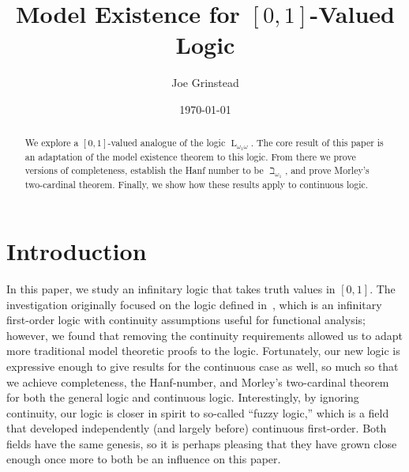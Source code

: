 \documentclass{amsart}
\theoremstyle{definition}
\numberwithin{equation}{theorem}
\newcommand{\baselang}{\operatorname{L}}
\newcommand{\lang}{\baselang_{\omega_1\omega}}
\begin{document}
\title{Model Existence for $[0,1]$-Valued Logic}

\author{Joe Grinstead}

\address{Department of Mathematics, CMU}




\date{\today}



\begin{abstract}
	We explore a $[0,1]$-valued analogue of the logic $\lang$.
	The core result of this paper is an adaptation of the model existence theorem to this logic.
	From there we prove versions of completeness, establish the Hanf number to be $\beth_{\omega_1}$, and prove Morley's two-cardinal theorem.
	Finally, we show how these results apply to continuous logic.
\end{abstract}

\maketitle
\tableofcontents
\newpage

\section*{Introduction}
In this paper, we study an infinitary logic that takes truth values in $[0,1]$.
The investigation originally focused on the logic defined in~\cite{eagle2014omitting}, which is an infinitary first-order logic with continuity assumptions useful for functional analysis; however, we found that removing the continuity requirements allowed us to adapt more traditional model theoretic proofs to the logic.
Fortunately, our new logic is expressive enough to give results for the continuous case as well, so much so that we achieve completeness, the Hanf-number, and Morley's two-cardinal theorem for both the general logic and continuous logic.
Interestingly, by ignoring continuity, our logic is closer in spirit to so-called ``fuzzy logic,'' which is a field that developed independently (and largely before) continuous first-order.
Both fields have the same genesis, so it is perhaps pleasing that they have grown close enough once more to both be an influence on this paper.
\end{document}
